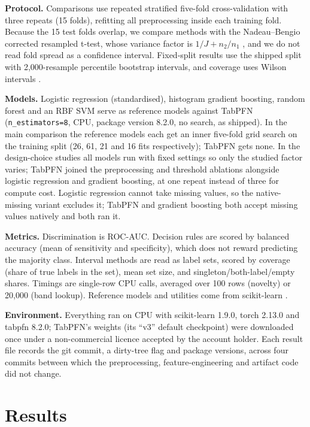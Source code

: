 \documentclass[conference]{IEEEtran}
\begin{document}
\textbf{Protocol.} Comparisons use repeated stratified five-fold cross-validation with three repeats (15 folds), refitting all preprocessing inside each training fold. Because the 15 test folds overlap, we compare methods with the Nadeau--Bengio corrected resampled t-test, whose variance factor is $1/J + n_2/n_1$ \cite{nadeau2003}, and we do not read fold spread as a confidence interval. Fixed-split results use the shipped split with 2,000-resample percentile bootstrap intervals, and coverage uses Wilson intervals \cite{brown2001}.

\textbf{Models.} Logistic regression (standardised), histogram gradient boosting, random forest and an RBF SVM serve as reference models against TabPFN (\texttt{n\_estimators=8}, CPU, package version 8.2.0, no search, as shipped). In the main comparison the reference models each get an inner five-fold grid search on the training split (26, 61, 21 and 16 fits respectively); TabPFN gets none. In the design-choice studies all models run with fixed settings so only the studied factor varies; TabPFN joined the preprocessing and threshold ablations alongside logistic regression and gradient boosting, at one repeat instead of three for compute cost. Logistic regression cannot take missing values, so the native-missing variant excludes it; TabPFN and gradient boosting both accept missing values natively and both ran it.

\textbf{Metrics.} Discrimination is ROC-AUC. Decision rules are scored by balanced accuracy (mean of sensitivity and specificity), which does not reward predicting the majority class. Interval methods are read as label sets, scored by coverage (share of true labels in the set), mean set size, and singleton/both-label/empty shares. Timings are single-row CPU calls, averaged over 100 rows (novelty) or 20,000 (band lookup). Reference models and utilities come from scikit-learn \cite{pedregosa2011}.

\textbf{Environment.} Everything ran on CPU with scikit-learn 1.9.0, torch 2.13.0 and tabpfn 8.2.0; TabPFN's weights (its ``v3'' default checkpoint) were downloaded once under a non-commercial licence accepted by the account holder. Each result file records the git commit, a dirty-tree flag and package versions, across four commits between which the preprocessing, feature-engineering and artifact code did not change.

\section{Results}
\end{document}
